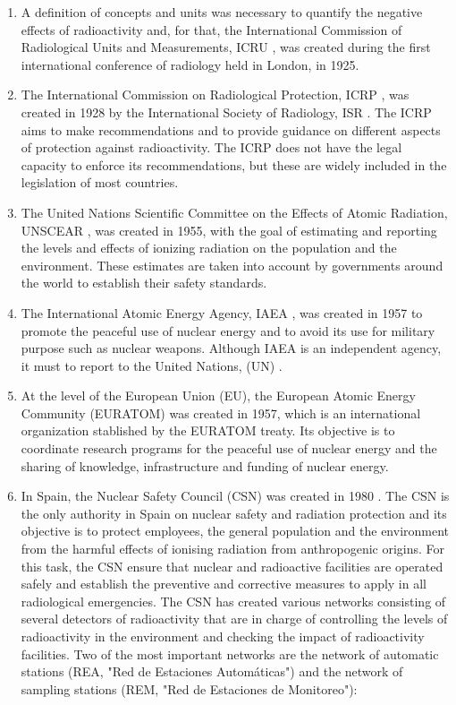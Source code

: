 \begin{enumerate}
\item{} A definition of concepts and units was necessary to quantify the negative effects of radioactivity and, for that, the International Commission of Radiological Units and Measurements, ICRU \cite{ICRU}, was created during the first international conference of radiology held in London, in 1925.

\item{} The International Commission on Radiological Protection, ICRP \cite{ICRP}, was created in 1928 by the International Society of Radiology, ISR \cite{ISR}. The ICRP aims to make recommendations and to provide guidance on different aspects of protection against radioactivity. The ICRP does not have the legal capacity to enforce its recommendations, but these are widely included in the legislation of most countries. %

\item{} The United Nations Scientific Committee on the Effects of Atomic Radiation, UNSCEAR \cite{UNSCEAR}, was created in 1955, with the goal of estimating and reporting the levels and effects of ionizing radiation on the population and the environment. These estimates are taken into account by governments around the world to establish their safety standards.

\item{} The International Atomic Energy Agency, IAEA \cite{IAEA}, was created in 1957 to promote the peaceful use of nuclear energy and to avoid its use for military purpose such as nuclear weapons. Although IAEA is an independent agency, it must to report to the United Nations, (UN) \cite{UN}.

\item{} At the level of the European Union (EU), the European Atomic Energy Community (EURATOM) was created in 1957, which is an international organization stablished by the EURATOM treaty. Its objective is to coordinate research programs for the peaceful use of nuclear energy and the sharing of knowledge, infrastructure and funding of nuclear energy.

\item{} In Spain, the Nuclear Safety Council (CSN) was created in 1980 \cite{CSN}. The CSN is the only authority in Spain on nuclear safety and radiation protection and its objective is to protect employees, the general population and the environment from the harmful effects of ionising radiation from anthropogenic origins. For this task, the CSN ensure that nuclear and radioactive facilities are operated safely and establish the preventive and corrective measures to apply in all radiological emergencies. The CSN has created various networks consisting of several detectors of radioactivity that are in charge of controlling the levels of radioactivity in the environment and checking the impact of radioactivity facilities. Two of the most important networks are the network of automatic stations (REA, "Red de Estaciones Automáticas") and the network of sampling stations (REM, "Red de Estaciones de Monitoreo"):


\end{enumerate}
